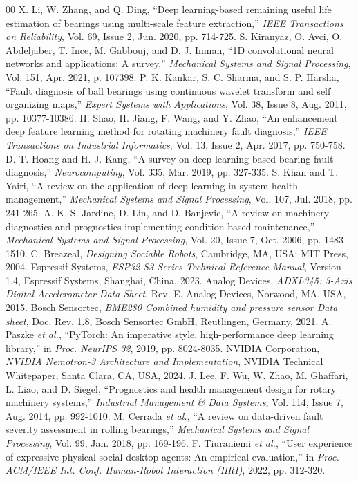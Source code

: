 \documentclass[10pt,journal,onecolumn]{IEEEtran}
\begin{document}
\begin{thebibliography}{00}
 X. Li, W. Zhang, and Q. Ding, ``Deep learning-based remaining useful life estimation of bearings using multi-scale feature extraction,'' \textit{IEEE Transactions on Reliability}, Vol. 69, Issue 2, Jun. 2020, pp. 714-725.
 S. Kiranyaz, O. Avci, O. Abdeljaber, T. Ince, M. Gabbouj, and D. J. Inman, ``1D convolutional neural networks and applications: A survey,'' \textit{Mechanical Systems and Signal Processing}, Vol. 151, Apr. 2021, p. 107398.
 P. K. Kankar, S. C. Sharma, and S. P. Harsha, ``Fault diagnosis of ball bearings using continuous wavelet transform and self organizing maps,'' \textit{Expert Systems with Applications}, Vol. 38, Issue 8, Aug. 2011, pp. 10377-10386.
 H. Shao, H. Jiang, F. Wang, and Y. Zhao, ``An enhancement deep feature learning method for rotating machinery fault diagnosis,'' \textit{IEEE Transactions on Industrial Informatics}, Vol. 13, Issue 2, Apr. 2017, pp. 750-758.
 D. T. Hoang and H. J. Kang, ``A survey on deep learning based bearing fault diagnosis,'' \textit{Neurocomputing}, Vol. 335, Mar. 2019, pp. 327-335.
 S. Khan and T. Yairi, ``A review on the application of deep learning in system health management,'' \textit{Mechanical Systems and Signal Processing}, Vol. 107, Jul. 2018, pp. 241-265.
 A. K. S. Jardine, D. Lin, and D. Banjevic, ``A review on machinery diagnostics and prognostics implementing condition-based maintenance,'' \textit{Mechanical Systems and Signal Processing}, Vol. 20, Issue 7, Oct. 2006, pp. 1483-1510.
 C. Breazeal, \textit{Designing Sociable Robots}, Cambridge, MA, USA: MIT Press, 2004.
 Espressif Systems, \textit{ESP32-S3 Series Technical Reference Manual}, Version 1.4, Espressif Systems, Shanghai, China, 2023.
 Analog Devices, \textit{ADXL345: 3-Axis Digital Accelerometer Data Sheet}, Rev. E, Analog Devices, Norwood, MA, USA, 2015.
 Bosch Sensortec, \textit{BME280 Combined humidity and pressure sensor Data sheet}, Doc. Rev. 1.8, Bosch Sensortec GmbH, Reutlingen, Germany, 2021.
 A. Paszke \textit{et al.}, ``PyTorch: An imperative style, high-performance deep learning library,'' in \textit{Proc. NeurIPS 32}, 2019, pp. 8024-8035.
 NVIDIA Corporation, \textit{NVIDIA Nemotron-3 Architecture and Implementation}, NVIDIA Technical Whitepaper, Santa Clara, CA, USA, 2024.
 J. Lee, F. Wu, W. Zhao, M. Ghaffari, L. Liao, and D. Siegel, ``Prognostics and health management design for rotary machinery systems,'' \textit{Industrial Management \& Data Systems}, Vol. 114, Issue 7, Aug. 2014, pp. 992-1010.
 M. Cerrada \textit{et al.}, ``A review on data-driven fault severity assessment in rolling bearings,'' \textit{Mechanical Systems and Signal Processing}, Vol. 99, Jan. 2018, pp. 169-196.
 F. Tiuraniemi \textit{et al.}, ``User experience of expressive physical social desktop agents: An empirical evaluation,'' in \textit{Proc. ACM/IEEE Int. Conf. Human-Robot Interaction (HRI)}, 2022, pp. 312-320.
\end{thebibliography}
\end{document}
